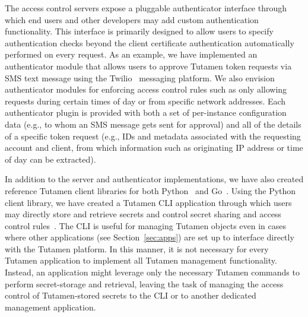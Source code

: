 The access control servers expose a pluggable authenticator interface
through which end users and other developers may add custom
authentication functionality. This interface is primarily designed to
allow users to specify authentication checks beyond the client
certificate authentication automatically performed on every
request. As an example, we have implemented an authenticator module
that allows users to approve Tutamen token requests via SMS text
message using the Twilio~\cite{twilio} messaging platform. We also
envision authenticator modules for enforcing access control rules such
as only allowing requests during certain times of day or from specific
network addresses. Each authenticator plugin is provided with both a
set of per-instance configuration data (e.g., to whom an SMS message
gets sent for approval) and all of the details of a specific token
request (e.g., IDs and metadata associated with the requesting account
and client, from which information such as originating IP address or
time of day can be extracted).

In addition to the server and authenticator implementations, we have
also created reference Tutamen client libraries for both
Python~\cite{src-tutamen-pytutamen} and
Go~\cite{src-tutamen-go}. Using the Python client library, we have
created a Tutamen CLI application through which users may directly
store and retrieve secrets and control secret sharing and access
control rules~\cite{src-tutamen-cli}. The CLI is useful for managing
Tutamen objects even in cases where other applications (see
Section~\ref{sec:apps}) are set up to interface directly with the
Tutamen platform. In this manner, it is not necessary for every
Tutamen application to implement all Tutamen management
functionality. Instead, an application might leverage only the
necessary Tutamen commands to perform secret-storage and retrieval,
leaving the task of managing the access control of Tutamen-stored
secrets to the CLI or to another dedicated management application.

